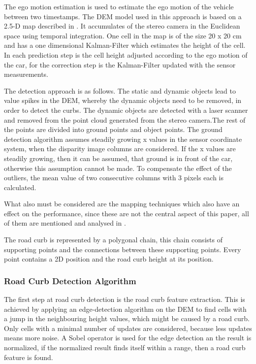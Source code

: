 \documentclass[conference]{IEEEtran}
\begin{document}
The ego motion estimation is used to estimate the ego motion of the vehicle between two timestamps. The DEM model used in this approach is based on a 2.5-D map described in \cite{bewegung}. It accumulates of the stereo camera in the Euclidean space using temporal integration. One cell in the map is of the size 20 x 20 cm and has a one dimensional Kalman-Filter which estimates the height of the cell. In each prediction step is the cell height adjusted according to the ego motion of the car, for the correction step is the Kalman-Filter updated with the sensor measurements. 

The detection approach is as follows. The static and dynamic objects lead to value spikes in the DEM, whereby the dynamic objects need to be removed, in order to detect the curbs. The dynamic objects are detected with a laser scanner and removed from the point cloud generated from the stereo camera.The rest of the points are divided into ground points and object points. The ground detection algorithm assumes steadily growing x values in the sensor coordinate system, when the disparity image columns are considered. If the x values are steadily growing, then it can be assumed, that ground is in front of the car, otherwise this assumption cannot be made. To compensate the effect of the outliers, the mean value of two consecutive columns with 3 pixels each is calculated.

What also must be considered are the mapping techniques which also have an effect on the performance, since these are not the central aspect of this paper, all of them are mentioned and analysed in \cite{stereo}. 

The road curb is represented by a polygonal chain, this chain consists of supporting points and the connections between these supporting points. Every point contains a 2D position and the road curb height at its position. 

\subsubsection{Road Curb Detection Algorithm}

The first step at road curb detection is the road curb feature extraction. This is achieved by applying an edge-detection algorithm on the DEM to find cells with a jump in the neighbouring height values, which might be caused by a road curb. Only cells with a minimal number of updates are considered, because less updates means more noise. A Sobel operator is used for the edge detection an the result is normalized, if the normalized result finds itself within a range, then a road curb feature is found.
\end{document}

